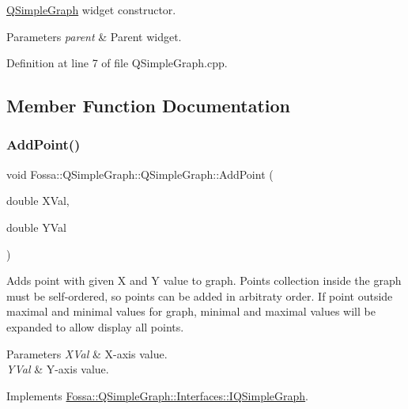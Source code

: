 \hyperlink{class_fossa_1_1_q_simple_graph_1_1_q_simple_graph}{Q\+Simple\+Graph} widget constructor. 


\begin{DoxyParams}{Parameters}
{\em parent} & Parent widget. \\
\hline
\end{DoxyParams}


Definition at line 7 of file Q\+Simple\+Graph.\+cpp.



\subsection{Member Function Documentation}
\mbox{\label{class_fossa_1_1_q_simple_graph_1_1_q_simple_graph_a39fdbd2aa624b7b086b5761308d8d49c}} 
\subsubsection{\texorpdfstring{Add\+Point()}{AddPoint()}}
{\footnotesize\ttfamily void Fossa\+::\+Q\+Simple\+Graph\+::\+Q\+Simple\+Graph\+::\+Add\+Point (\begin{DoxyParamCaption}\item[{double}]{X\+Val,  }\item[{double}]{Y\+Val }\end{DoxyParamCaption})\hspace{0.3cm}{\ttfamily [virtual]}}



Adds point with given X and Y value to graph. Points collection inside the graph must be self-\/ordered, so points can be added in arbitraty order. If point outside maximal and minimal values for graph, minimal and maximal values will be expanded to allow display all points. 


\begin{DoxyParams}{Parameters}
{\em X\+Val} & X-\/axis value. \\
\hline
{\em Y\+Val} & Y-\/axis value. \\
\hline
\end{DoxyParams}


Implements \hyperlink{class_fossa_1_1_q_simple_graph_1_1_interfaces_1_1_i_q_simple_graph_a5d43e4e0f06bedb1734e4240070fe229}{Fossa\+::\+Q\+Simple\+Graph\+::\+Interfaces\+::\+I\+Q\+Simple\+Graph}.



